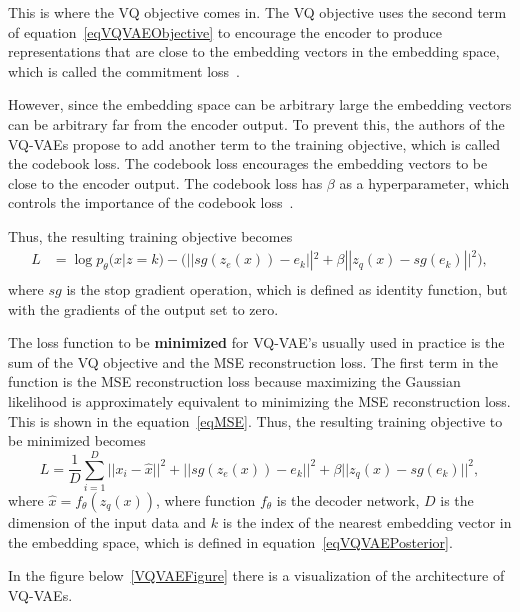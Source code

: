 This is where the VQ objective comes in. The VQ objective uses the second term of equation~\ref{eqVQVAEObjective} to encourage the encoder to produce representations that are close to the embedding vectors in the embedding space, which is called the commitment loss~\cite{vqvae}.

However, since the embedding space can be arbitrary large the embedding vectors can be arbitrary far from the encoder output. To prevent this, the authors of the VQ-VAEs propose to add another term to the training objective, which is called the codebook loss. The codebook loss encourages the embedding vectors to be close to the encoder output. The codebook loss has $\beta$ as a hyperparameter, which controls the importance of the codebook loss~\cite{vqvae}.

Thus, the resulting training objective becomes
\begin{equation} \label{eqVQVAEObjective}
    \begin{split}
        L &= \log p_{\theta}(x|z = k) - \biggl( || sg(z_e(x)) - e_k ||^2 + \beta || z_q(x) - sg(e_k) ||^2 \biggr),\\
    \end{split}
\end{equation}
where $sg$ is the stop gradient operation, which is defined as identity function, but with the gradients of the output set to zero.

The loss function to be \textbf{minimized} for VQ-VAE's usually used in practice is the sum of the VQ objective and the MSE reconstruction loss.
The first term in the function is the MSE reconstruction loss because maximizing the Gaussian likelihood is approximately equivalent to minimizing the MSE reconstruction loss. This is shown in the equation~\ref{eqMSE}. 
Thus, the resulting training objective to be minimized becomes
\[ L = \frac{1}{D} \sum_{i=1}^{D} ||x_i - \hat{x} ||^2 + || sg(z_e(x)) - e_k ||^2 + \beta || z_q(x) - sg(e_k) ||^2 , \]
where $\hat{x} = f_{\theta}(z_q(x))$, where function $f_{\theta}$ is the decoder network, $D$ is the dimension of the input data and $k$ is the index of the nearest embedding vector in the embedding space, which is defined in equation~\ref{eqVQVAEPosterior}. 

In the figure below~\ref{VQVAEFigure} there is a visualization of the architecture of VQ-VAEs.

